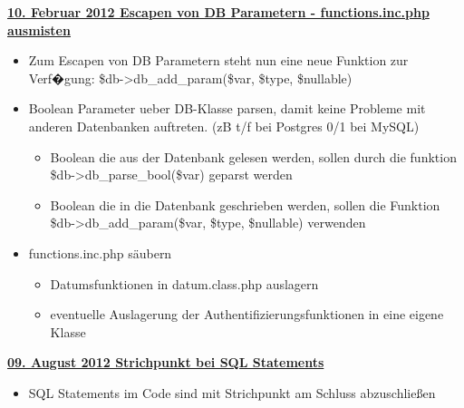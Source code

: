 \underline{{\bf 10. Februar 2012 Escapen von DB Parametern - functions.inc.php ausmisten }}
\begin{itemize}
	\item Zum Escapen von DB Parametern steht nun eine neue Funktion zur Verf�gung: \$db->db\_add\_param(\$var, \$type, \$nullable) 
	\item Boolean Parameter ueber DB-Klasse parsen, damit keine Probleme mit anderen Datenbanken auftreten. (zB t/f bei Postgres 0/1 bei MySQL)
	\begin{itemize}
		\item Boolean die aus der Datenbank gelesen werden, sollen durch die funktion \$db->db\_parse\_bool(\$var) geparst werden
		\item Boolean die in die Datenbank geschrieben werden, sollen die Funktion \$db->db\_add\_param(\$var, \$type, \$nullable) verwenden
	\end{itemize}
	\item functions.inc.php s\"aubern
	\begin{itemize}
		\item Datumsfunktionen in datum.class.php auslagern
		\item eventuelle Auslagerung der Authentifizierungsfunktionen in eine eigene Klasse\newline
	\end{itemize}
\end{itemize}
\underline{{\bf 09. August 2012 Strichpunkt bei SQL Statements }}
\begin{itemize}
		\item SQL Statements im Code sind mit Strichpunkt am Schluss abzuschlie\ss{}en
\end{itemize}

